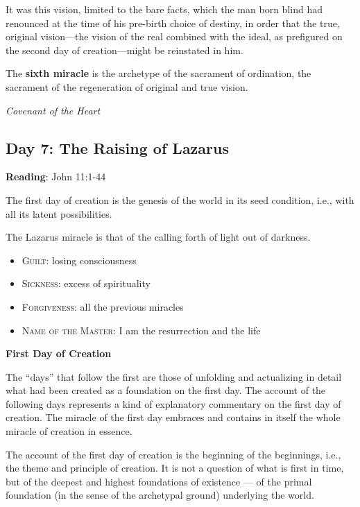 It was this vision, limited to the bare facts, which the man born blind had renounced at the time of his pre-birth
choice of destiny, in order that the true, original vision—the vision of the real combined with
the ideal, as prefigured on the second day of creation—might be reinstated in him.

\begin{quotationx}
The \textbf{sixth miracle} is the archetype of the sacrament of ordination, the sacrament of the regeneration of
original and true vision. \begin{flushright} \emph{Covenant of the Heart}\end{flushright}

\end{quotationx}
\subsection*{Day 7: The Raising of Lazarus}
\textbf{Reading}: John 11:1-44

The first day of creation is the genesis of the world in its seed condition, i.e., with all its latent possibilities.

The Lazarus miracle is that of the calling forth of light out of darkness.

\begin{itemize}
\item \textsc{Guilt}: losing consciousness 
\item \textsc{Sickness}: excess of spirituality 
\item \textsc{Forgiveness}: all the previous miracles 
\item \textsc{Name of the Master}: I am the resurrection and the life 
\end{itemize}
\textbf{First Day of Creation}

The “days” that follow the first are those of unfolding and actualizing in detail what had been created as a foundation
on the first day. The account of the following days represents a kind of explanatory commentary on the first day of
creation. The miracle of the first day embraces and contains in itself the whole miracle of creation in essence.

The account of the first day of creation is the beginning of the beginnings, i.e., the theme and principle of creation.
It is not a question of what is first in time, but of the deepest and highest foundations of existence
— of the primal foundation (in the sense of the archetypal ground) underlying the world.


